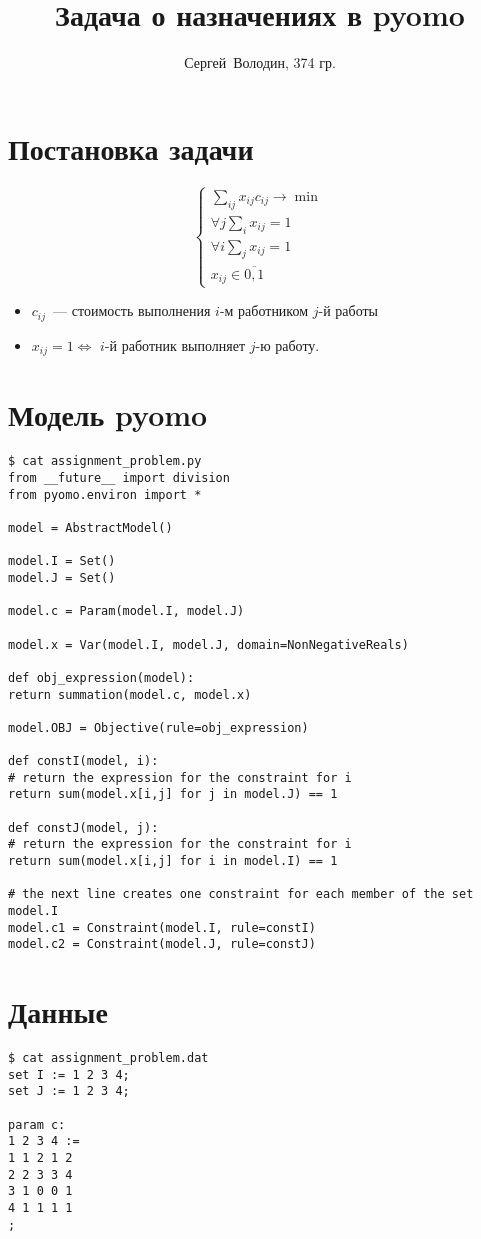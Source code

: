 \documentclass[a4paper]{article}
\title{Задача о назначениях в pyomo}
\author{Сергей~Володин, 374 гр.}
\begin{document}
\maketitle
\section*{Постановка задачи}
$$\begin{cases}
\sum\limits_{ij} x_{ij}c_{ij}\to\min\\
\forall j \sum\limits_i x_{ij}=1\\
\forall i \sum\limits_j x_{ij}=1\\
x_{ij}\in\overline{0,1}
\end{cases}$$

\begin{itemize}
\item $c_{ij}$~--- стоимость выполнения $i$-м работником $j$-й работы
\item  $x_{ij}=1\Leftrightarrow$ $i$-й работник выполняет $j$-ю работу.
\end{itemize}
\section*{Модель pyomo}
\begin{verbatim}
$ cat assignment_problem.py
from __future__ import division
from pyomo.environ import *

model = AbstractModel()

model.I = Set()
model.J = Set()

model.c = Param(model.I, model.J)

model.x = Var(model.I, model.J, domain=NonNegativeReals)

def obj_expression(model):
return summation(model.c, model.x)

model.OBJ = Objective(rule=obj_expression)

def constI(model, i):
# return the expression for the constraint for i
return sum(model.x[i,j] for j in model.J) == 1

def constJ(model, j):
# return the expression for the constraint for i
return sum(model.x[i,j] for i in model.I) == 1

# the next line creates one constraint for each member of the set model.I
model.c1 = Constraint(model.I, rule=constI)
model.c2 = Constraint(model.J, rule=constJ)
\end{verbatim}
\section*{Данные}
\begin{verbatim}
$ cat assignment_problem.dat
set I := 1 2 3 4;
set J := 1 2 3 4;

param c:
1 2 3 4 :=
1 1 2 1 2
2 2 3 3 4
3 1 0 0 1
4 1 1 1 1
;
\end{verbatim}
\end{document}
